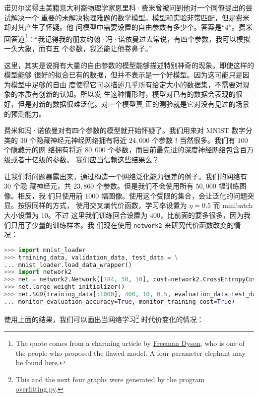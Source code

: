 诺贝尔奖得主美籍意大利裔物理学家恩里科·费米曾被问到他对一个同僚提出的尝试解决一个
重要的未解决物理难题的数学模型。模型和实验非常匹配，但是费米却对其产生了怀疑。他
问模型中需要设置的自由参数有多少个。答案是``4''。费米回答道\footnote{The quote
  comes from a charming article by
  \href{http://www.nature.com/nature/journal/v427/n6972/full/427297a.html}{Freeman
    Dyson}, who is one of the people who proposed the flawed model. A
  four-parameter elephant may be found
  \href{http://www.johndcook.com/blog/2011/06/21/how-to-fit-an-elephant/}{here}.
}：“我记得我的朋友约翰·冯·诺依曼过去常说，有四个参数，我可以模拟一头大象，而有五
个参数，我还能让他卷鼻子。”

这里，其实是说拥有大量的自由参数的模型能够描述特别神奇的现象。即使这样的模型能够
很好的拟合已有的数据，但并不表示是一个好模型。因为这可能只是因为模型中足够的自由
度使得它可以描述几乎所有给定大小的数据集，不需要对现象的本质有创新的认知。所以发
生这种情形时，模型对已有的数据会表现的很好，但是对新的数据很难泛化。对一个模型真
正的测验就是它对没有见过的场景的预测能力。

费米和冯·诺依曼对有四个参数的模型就开始怀疑了。我们用来对 MNIST 数字分类的 $30$
个隐藏神经元神经网络拥有将近 $24,000$ 个参数！当然很多。我们有 $100$ 个隐藏元的网
络拥有将近 $80,000$ 个参数，而目前最先进的深度神经网络包含百万级或者十亿级的参数。
我们应当信赖这些结果么？

让我们将问题暴露出来，通过构造一个网络泛化能力很差的例子。我们的网络有 $30$ 个隐
藏神经元，共 $23,860$ 个参数。但是我们不会使用所有 $50,000$ 幅训练图像。相反，我
们只使用前 $1000$ 幅图像。使用这个受限的集合，会让泛化的问题突显。按照同样的方式，
使用交叉熵代价函数，学习率设置为 $\eta = 0.5$ 而 minibatch 大小设置为 $10$。不过
这里我们训练回合设置为 $400$，比前面的要多很多，因为我们只用了少量的训练样本。我
们现在使用 \lstinline!network2! 来研究代价函数改变的情况：

\begin{lstlisting}[language=Python]
>>> import mnist_loader 
>>> training_data, validation_data, test_data = \
... mnist_loader.load_data_wrapper()
>>> import network2 
>>> net = network2.Network([784, 30, 10], cost=network2.CrossEntropyCost) 
>>> net.large_weight_initializer()
>>> net.SGD(training_data[:1000], 400, 10, 0.5, evaluation_data=test_data,
... monitor_evaluation_accuracy=True, monitor_training_cost=True)
\end{lstlisting}

使用上面的结果，我们可以画出当网络学习\footnote{This and the next four graphs
  were generated by the program
  \href{https://github.com/mnielsen/neural-networks-and-deep-learning/blob/master/fig/overfitting.py}{overfitting.py}.}
时代价变化的情况：

